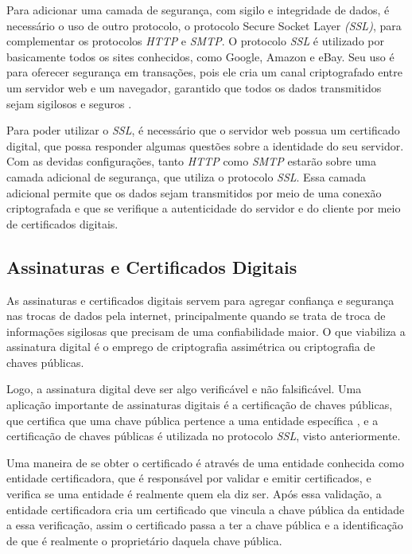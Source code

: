Para adicionar uma camada de segurança, com sigilo e integridade de dados, é necessário
o uso de outro protocolo, o protocolo Secure Socket Layer \textit{(SSL)}, para 
complementar os protocolos \textit{HTTP} e \textit{SMTP}. O protocolo \textit{SSL} 
é utilizado por basicamente todos os sites conhecidos, como Google,
Amazon e eBay. Seu uso é para oferecer segurança em transações, pois ele cria um
canal criptografado entre um servidor web e um navegador, garantido que todos os
dados transmitidos sejam sigilosos e seguros \cite{kurose2010redes}. 

Para poder utilizar o \textit{SSL}, é necessário que o servidor web 
possua um certificado digital, que possa responder algumas questões sobre a 
identidade do seu servidor. Com as devidas configurações, tanto \textit{HTTP} como 
\textit{SMTP} estarão sobre uma camada adicional de segurança, que utiliza o 
protocolo \textit{SSL}. Essa camada adicional permite que os dados sejam 
transmitidos por meio de uma conexão criptografada e que se verifique a autenticidade
do servidor e do cliente por meio de certificados digitais. 

\subsection{Assinaturas e Certificados Digitais}

As assinaturas e certificados digitais servem para agregar confiança e segurança
nas trocas de dados pela internet, principalmente quando se trata de troca de informações
sigilosas que precisam de uma confiabilidade maior. O que viabiliza a assinatura 
digital é o emprego de criptografia assimétrica ou criptografia de chaves públicas. 

Logo, a assinatura digital deve ser algo verificável e não falsificável. Uma
aplicação importante de assinaturas digitais é a certificação de chaves públicas,
que certifica que uma chave pública pertence a uma entidade específica \cite{kurose2010redes},
e a certificação de chaves públicas é utilizada no protocolo \textit{SSL}, visto anteriormente.

Uma maneira de se obter o certificado é através de uma entidade conhecida como
entidade certificadora, que é responsável por validar e emitir certificados, e
verifica se uma entidade é realmente quem ela diz ser. Após essa validação, a
entidade certificadora cria um certificado que vincula a chave pública da entidade
a essa verificação, assim o certificado passa a ter a chave pública e a
identificação de que é realmente o proprietário daquela chave pública.

